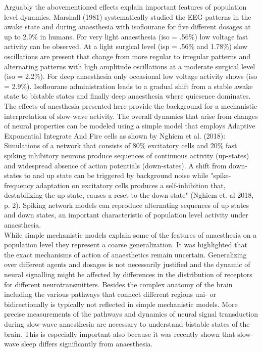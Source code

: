 Arguably the abovementioned effects explain important features of population level dynamics. Marshall (1981) systematically studied the EEG patterns in the awake state and during anaesthesia with isoflourane for five different dosages at up to 2.9\% in humans. For very light anaesthesia (iso = .56\%) low voltage fast activity can be observed. At a light surgical level (isp = .56\% and 1.78\%) slow oscillations are present that change from more regular to irregular patterns and alternating patterns with high amplitude oscillations at a moderate surgical level (iso = 2.2\%). For deep anaesthesia only occasional low voltage activity shows (iso = 2.9\%). Isoflourane administration leads to a gradual shift from a stable awake state to bistable states and finally deep anaesthesia where quiesence dominates.\\
The effects of anesthesia presented here provide the background for a mechanistic interpretation of slow-wave activity. The overall dynamics that arise from changes of neural properties can be modeled using a simple model that employs Adaptive Exponential Integrate And Fire cells as shown by Nghiem et al. (2018): Simulations of a network that consists of 80\% excitatory cells and 20\% fast spiking inhibitory neurons produce sequences of continuous activity (up-states) and widespread absence of action potentials (down-states). A shift from down-states to and up state can be triggered by background noise while "spike-frequency adaptation on excitatory cells produces a self-inhibition that, destabilizing the up state, causes a reset to the down state" (Nghiem et. al 2018, p. 2). Spiking network models can reproduce alternating sequences of up states and down states, an important characteristic of population level activity under anaesthesia. \\
While simple mechanistic models explain some of the features of anaesthesia on a population level they represent a coarse generalization. It was highlighted that the exact mechanisms of action of anaesthetics remain uncertain. Generalizing over different agents and dosages is not necessarily justified and the dynamic of neural signalling might be affected by differences in the distribution of receptors for different neurotransmitters. Besides the complex anatomy of the brain including the various pathways that connect different regions uni- or bidirectionally is typically not reflected in simple mechanistic models. More precise measurements of the pathways and dynamics of neural signal transduction during slow-wave anaesthesia are necessary to understand bistable states of the brain. This is especially important also because it was recently shown that slow-wave sleep differs significantly from anaesthesia.

